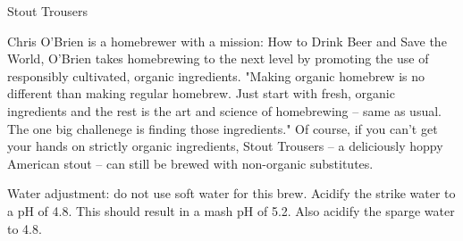 \begin{recipie}{Stout Trousers}

\begin{aboutblock}
Chris O'Brien is a homebrewer with a mission: How to Drink
Beer and Save the World, O'Brien takes homebrewing to the next level
by promoting the use of responsibly cultivated, organic ingredients.
"Making organic homebrew is no different than making regular homebrew.
Just start with fresh, organic ingredients and the rest is the art and
science of homebrewing -- same as usual. The one big challenege is finding those
ingredients." Of course, if you can't get your hands on strictly
organic ingredients, Stout Trousers -- a deliciously hoppy American
stout -- can still be brewed with non-organic substitutes.
\end{aboutblock}


\begin{methodandtiming}
 
\begin{mashsteps}
\end{mashsteps}

\begin{fermentationsteps}
\end{fermentationsteps}

\begin{directions}
Water adjustment: do not use soft water for this brew. Acidify the strike water
to a pH of 4.8. This should result in a mash pH of 5.2. Also acidify the sparge
water to 4.8.
\end{directions}

\end{methodandtiming}

\pagebreak

\begin{ingredientsblock}

\begin{malts}
\end{malts}

\begin{hops}
\end{hops}


\end{ingredientsblock}

\end{recipie}